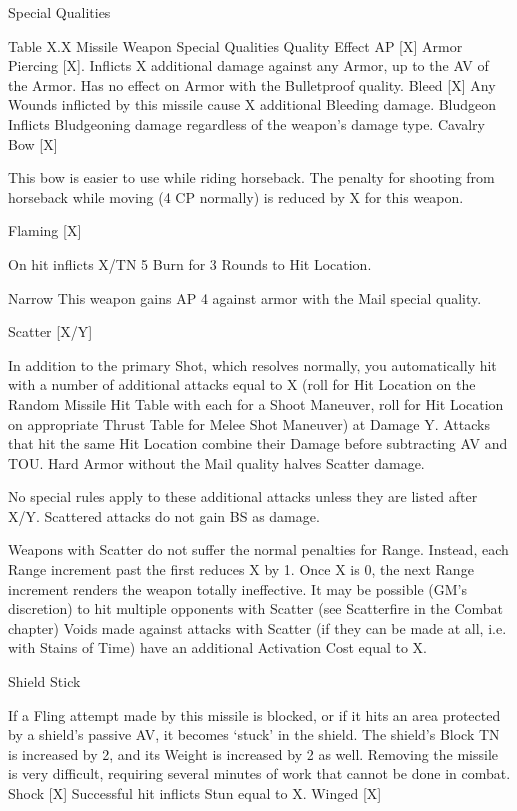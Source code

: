\documentclass[oneside,11pt,english]{book}
\begin{document}
 

Special Qualities 

 
Table X.X Missile Weapon Special Qualities 
Quality Effect 
AP [X] Armor Piercing [X]. Inflicts X additional damage against any Armor, up to the AV of the Armor. Has 
no effect on Armor with the Bulletproof quality. 
Bleed [X] Any Wounds inflicted by this missile cause X additional Bleeding damage. 
Bludgeon Inflicts Bludgeoning damage regardless of the weapon’s damage type. 
Cavalry 
Bow [X] 

This bow is easier to use while riding horseback. The penalty for shooting from horseback while 
moving (4 CP normally) is reduced by X for this weapon. 

Flaming 
[X] 

On hit inflicts X/TN 5 Burn for 3 Rounds to Hit Location. 

Narrow This weapon gains AP 4 against armor with the Mail special quality. 


Scatter 
[X/Y] 

In addition to the primary Shot, which resolves normally, you automatically hit with a number of 
additional attacks equal to X (roll for Hit Location on the Random Missile Hit Table with each for a 
Shoot Maneuver, roll for Hit Location on appropriate Thrust Table for Melee Shot Maneuver) at 
Damage Y. Attacks that hit the same Hit Location combine their Damage before subtracting AV and 
TOU. 
Hard Armor without the Mail quality halves Scatter damage. 

 

 No special rules apply to these additional attacks unless they are listed after X/Y. Scattered attacks do 
not gain BS as damage. 

 

Weapons with Scatter do not suffer the normal penalties for Range. Instead, each Range increment 
past the first reduces X by 1. Once X is 0, the next Range increment renders the weapon totally 
ineffective. It may be possible (GM’s discretion) to hit multiple opponents with Scatter (see 
Scatterfire in the Combat chapter) 
Voids made against attacks with Scatter (if they can be made at all, i.e. with Stains of Time) have an 
additional Activation Cost equal to X. 

Shield 
Stick 

If a Fling attempt made by this missile is blocked, or if it hits an area protected by a shield’s passive 
AV, it becomes ‘stuck’ in the shield. The shield’s Block TN is increased by 2, and its Weight is 
increased by 2 as well. Removing the missile is very difficult, requiring several minutes of work that 
cannot be done in combat. 
Shock [X] Successful hit inflicts Stun equal to X. 
Winged 
[X] 
\end{document}
